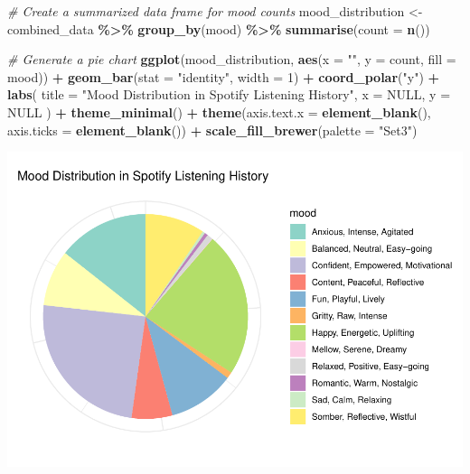 \documentclass[
]{article}
\newenvironment{Shaded}{\begin{snugshade}}{\end{snugshade}}
\newcommand{\AttributeTok}[1]{\textcolor[rgb]{0.13,0.29,0.53}{#1}}
\newcommand{\CommentTok}[1]{\textcolor[rgb]{0.56,0.35,0.01}{\textit{#1}}}
\newcommand{\ConstantTok}[1]{\textcolor[rgb]{0.56,0.35,0.01}{#1}}
\newcommand{\DecValTok}[1]{\textcolor[rgb]{0.00,0.00,0.81}{#1}}
\newcommand{\FunctionTok}[1]{\textcolor[rgb]{0.13,0.29,0.53}{\textbf{#1}}}
\newcommand{\NormalTok}[1]{#1}
\newcommand{\OtherTok}[1]{\textcolor[rgb]{0.56,0.35,0.01}{#1}}
\newcommand{\SpecialCharTok}[1]{\textcolor[rgb]{0.81,0.36,0.00}{\textbf{#1}}}
\newcommand{\StringTok}[1]{\textcolor[rgb]{0.31,0.60,0.02}{#1}}
\begin{document}
\begin{Shaded}
\begin{Highlighting}[]
\CommentTok{\# Create a summarized data frame for mood counts}
\NormalTok{mood\_distribution }\OtherTok{\textless{}{-}}\NormalTok{ combined\_data }\SpecialCharTok{\%\textgreater{}\%}
  \FunctionTok{group\_by}\NormalTok{(mood) }\SpecialCharTok{\%\textgreater{}\%}
  \FunctionTok{summarise}\NormalTok{(}\AttributeTok{count =} \FunctionTok{n}\NormalTok{())}

\CommentTok{\# Generate a pie chart}
\FunctionTok{ggplot}\NormalTok{(mood\_distribution, }\FunctionTok{aes}\NormalTok{(}\AttributeTok{x =} \StringTok{""}\NormalTok{, }\AttributeTok{y =}\NormalTok{ count, }\AttributeTok{fill =}\NormalTok{ mood)) }\SpecialCharTok{+}
  \FunctionTok{geom\_bar}\NormalTok{(}\AttributeTok{stat =} \StringTok{"identity"}\NormalTok{, }\AttributeTok{width =} \DecValTok{1}\NormalTok{) }\SpecialCharTok{+}
  \FunctionTok{coord\_polar}\NormalTok{(}\StringTok{"y"}\NormalTok{) }\SpecialCharTok{+}
  \FunctionTok{labs}\NormalTok{(}
    \AttributeTok{title =} \StringTok{"Mood Distribution in Spotify Listening History"}\NormalTok{,}
    \AttributeTok{x =} \ConstantTok{NULL}\NormalTok{,}
    \AttributeTok{y =} \ConstantTok{NULL}
\NormalTok{  ) }\SpecialCharTok{+}
  \FunctionTok{theme\_minimal}\NormalTok{() }\SpecialCharTok{+}
  \FunctionTok{theme}\NormalTok{(}\AttributeTok{axis.text.x =} \FunctionTok{element\_blank}\NormalTok{(), }\AttributeTok{axis.ticks =} \FunctionTok{element\_blank}\NormalTok{()) }\SpecialCharTok{+}
  \FunctionTok{scale\_fill\_brewer}\NormalTok{(}\AttributeTok{palette =} \StringTok{"Set3"}\NormalTok{)}
\end{Highlighting}
\end{Shaded}

\includegraphics{SpotifyProjectPDF_files/figure-latex/unnamed-chunk-11-1.pdf}
\end{document}
